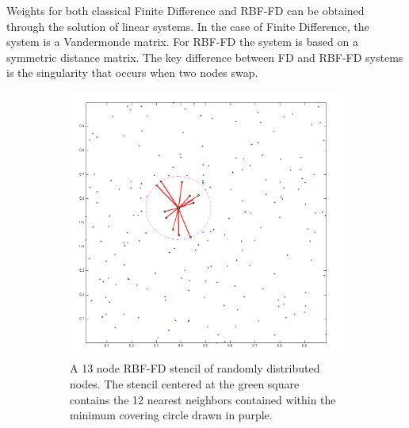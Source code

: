 \documentclass{report}
\begin{document}
{Weights for both classical Finite Difference and RBF-FD can be obtained through the solution of linear systems. In the case of Finite Difference, the system is a Vandermonde matrix. For RBF-FD the system is based on a symmetric distance matrix.  The key difference between FD and RBF-FD systems is the singularity that occurs when two nodes swap.


\begin{figure}[htbp]
	\centering
	\begin{subfigure}[m]{0.6\textwidth}
		\centering
		\includegraphics[width=1.0\textwidth]{../figures/chapter2/preview_stencils_example.png}
		\caption{A 13 node RBF-FD stencil of randomly distributed nodes. The stencil centered at the green square contains the 12 nearest neighbors contained within the minimum covering circle drawn in purple.}
		\label{fig:stencil_example_random}
	\end{subfigure}
	\begin{subfigure}[m]{0.35\textwidth}
		\centering

\end{subfigure}
\end{figure}}
\end{document}
